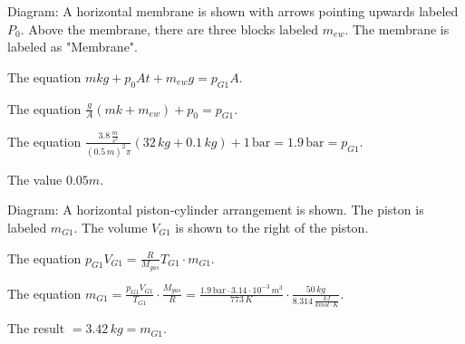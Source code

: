 Diagram:
A horizontal membrane is shown with arrows pointing upwards labeled \( P_0 \).
Above the membrane, there are three blocks labeled \( m_{ew} \).
The membrane is labeled as "Membrane".

The equation \( m k g + p_0 A t + m_{ew} g = p_{G1} A \).

The equation \( \frac{g}{A} (m k + m_{ew}) + p_0 = p_{G1} \).

The equation \( \frac{3.8 \, \frac{m}{s^2}}{(0.5 \, m)^2 \pi} (32 \, kg + 0.1 \, kg) + 1 \, \text{bar} = 1.9 \, \text{bar} = p_{G1} \).

The value \( 0.05 m \).

Diagram:
A horizontal piston-cylinder arrangement is shown. The piston is labeled \( m_{G1} \).
The volume \( V_{G1} \) is shown to the right of the piston.

The equation \( p_{G1} V_{G1} = \frac{R}{M_{gas}} T_{G1} \cdot m_{G1} \).

The equation \( m_{G1} = \frac{p_{G1} V_{G1}}{T_{G1}} \cdot \frac{M_{gas}}{R} = \frac{1.9 \, \text{bar} \cdot 3.14 \cdot 10^{-3} \, m^3}{773 \, K} \cdot \frac{50 \, kg}{8.314 \, \frac{kJ}{kmol \cdot K}} \).

The result \( = 3.42 \, kg = m_{G1} \).